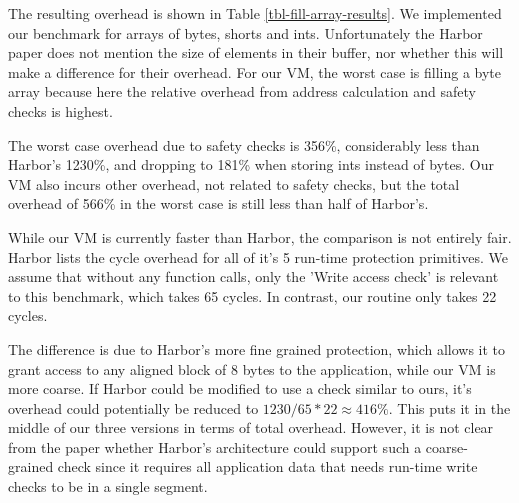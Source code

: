 The resulting overhead is shown in Table \ref{tbl-fill-array-results}. We implemented our benchmark for arrays of bytes, shorts and ints. Unfortunately the Harbor paper does not mention the size of elements in their buffer, nor whether this will make a difference for their overhead. For our VM, the worst case is filling a byte array because here the relative overhead from address calculation and safety checks is highest.

The worst case overhead due to safety checks is 356\%, considerably less than Harbor's 1230\%, and dropping to 181\% when storing ints instead of bytes. Our VM also incurs other overhead, not related to safety checks, but the total overhead of 566\% in the worst case is still less than half of Harbor's.

While our VM is currently faster than Harbor, the comparison is not entirely fair. Harbor lists the cycle overhead for all of it's 5 run-time protection primitives. We assume that without any function calls, only the 'Write access check' is relevant to this benchmark, which takes 65 cycles. In contrast, our  routine only takes 22 cycles.

The difference is due to Harbor's more fine grained protection, which allows it to grant access to any aligned block of 8 bytes to the application, while our VM is more coarse. If Harbor could be modified to use a check similar to ours, it's overhead could potentially be reduced to $1230 / 65 * 22 \approx 416\%$. This puts it in the middle of our three versions in terms of total overhead. However, it is not clear from the paper whether Harbor's architecture could support such a coarse-grained check since it requires all application data that needs run-time write checks to be in a single segment.





